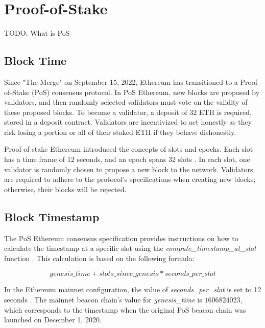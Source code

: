 

\section{Proof-of-Stake}
TODO: What is PoS

\subsection{Block Time}

Since "The Merge" on September 15, 2022, Ethereum has transitioned to a
Proof-of-Stake (PoS) consensus protocol. In PoS Ethereum, new blocks are
proposed by validators, and then randomly selected validators must vote on the
validity of these proposed blocks. To become a validator, a deposit of 32 ETH
is required, stored in a deposit contract. Validators are incentivized to act
honestly as they risk losing a portion or all of their staked ETH if they
behave dishonestly.

Proof-of-stake Ethereum introduced the concepts of slots and epochs. Each slot
has a time frame of 12 seconds, and an epoch spans 32 slots
\cite{seconds-per-slot-mainnet}\cite{seconds-per-slot-mainnet-doc}. In each
slot, one validator is randomly chosen to propose a new block to the network.
Validators are required to adhere to the protocol's specifications when
creating new blocks; otherwise, their blocks will be rejected.

\subsection{Block Timestamp}

The PoS Ethereum consensus specification provides instructions on how to
calculate the timestamp at a specific slot using the
\textit{compute\_timestamp\_at\_slot} function \cite{compute-timestamp-at-slot}.
This calculation is based on the following formula:

\begin{equation}
genesis\_time + slots\_since\_genesis *
seconds\_per\_slot
\end{equation}


In the Ethereum mainnet configuration, the value of \textit{seconds\_per\_slot} is set to
12 seconds \cite{seconds-per-slot-mainnet} \cite{seconds-per-slot-mainnet-doc}.
The mainnet beacon chain's value for \textit{genesis\_time} is $1606824023$, which
corresponds to the timestamp when the original PoS beacon chain was launched on
December 1, 2020.

